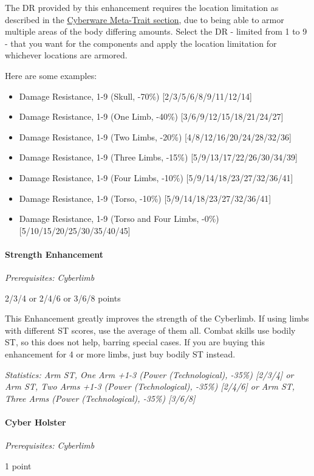 \begin{multicols*}{3}
	The DR provided by this enhancement requires the location limitation as described in the \hyperref[cyberware-meta-trait]{Cyberware Meta-Trait section}, due to being able to armor multiple areas of the body differing amounts. Select the DR - limited from 1 to 9 - that you want for the components and apply the location limitation for whichever locations are armored.
	
	Here are some examples:
	
	\begin{itemize}
		\itemsep0em 
		\item Damage Resistance, 1-9 (Skull, -70\%) [2/3/5/6/8/9/11/12/14]
		\item Damage Resistance, 1-9 (One Limb, -40\%) [3/6/9/12/15/18/21/24/27]
		\item Damage Resistance, 1-9 (Two Limbs, -20\%) [4/8/12/16/20/24/28/32/36]
		\item Damage Resistance, 1-9 (Three Limbs, -15\%) [5/9/13/17/22/26/30/34/39]
		\item Damage Resistance, 1-9 (Four Limbs, -10\%) [5/9/14/18/23/27/32/36/41]
		\item Damage Resistance, 1-9 (Torso, -10\%) [5/9/14/18/23/27/32/36/41]
		\item Damage Resistance, 1-9 (Torso and Four Limbs, -0\%) [5/10/15/20/25/30/35/40/45]
	\end{itemize}
	
	\paragraph{Strength Enhancement}
	\textit{Prerequisites: Cyberlimb}
	\begin{flushright}
		2/3/4 or 2/4/6 or 3/6/8 points
	\end{flushright}

	This Enhancement greatly improves the strength of the Cyberlimb. If using limbs with different ST scores, use the average of them all. Combat skills use bodily ST, so this does not help, barring special cases. If you are buying this enhancement for 4 or more limbs, just buy bodily ST instead. 
	
	\textit{\textcolor{OliveGreen}{Statistics: Arm ST, One Arm +1-3 (Power (Technological), -35\%) [2/3/4] or Arm ST, Two Arms +1-3 (Power (Technological), -35\%) [2/4/6] or Arm ST, Three Arms (Power (Technological), -35\%) [3/6/8]}}
	
	
	\paragraph{Cyber Holster}
	\textit{Prerequisites: Cyberlimb}
	\begin{flushright}
		1 point
	\end{flushright}
	

\end{multicols*}

